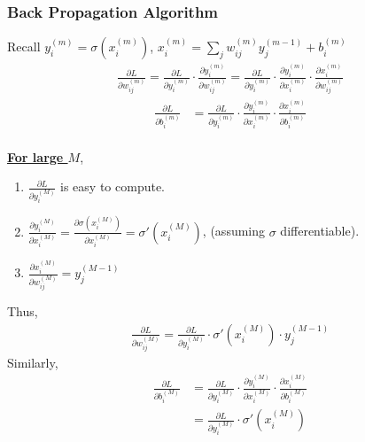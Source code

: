\documentclass[11pt,a4paper]{article}
\begin{document}
\subsubsection{Back Propagation Algorithm}
Recall $y_i^{(m)}=\sigma(x_i^{(m)})$, $x_i^{(m)}=\sum_jw_{ij}^{(m)}y_j^{(m-1)}+b_i^{(m)}$
\begin{equation}
    \begin{aligned}
        \frac{\partial L}{\partial w_{ij}^{(m)}}=\frac{\partial L}{\partial y_i^{(m)}}\cdot \frac{\partial y_i^{(m)}}{\partial w_{ij}^{(m)}}=\frac{\partial L}{\partial y_i^{(m)}}\cdot \frac{\partial y_i^{(m)}}{\partial x_{i}^{(m)}}\cdot \frac{\partial x_{i}^{(m)}}{\partial w_{ij}^{(m)}}
    \end{aligned}
    \nonumber
\end{equation}
\begin{equation}
    \begin{aligned}
        \frac{\partial L}{\partial b_{i}^{(m)}}&=\frac{\partial L}{\partial y_i^{(m)}}\cdot \frac{\partial y_i^{(m)}}{\partial x_{i}^{(m)}}\cdot \frac{\partial x_{i}^{(m)}}{\partial b_{i}^{(m)}}\\
    \end{aligned}
    \nonumber
\end{equation}

\textbf{\underline{For large $M$}},
\begin{enumerate}[$\bullet$]
    \item $\frac{\partial L}{\partial y_i^{(M)}}$ is easy to compute.
    \item $\frac{\partial y_i^{(M)}}{\partial x_{i}^{(M)}}=\frac{\partial \sigma(x_{i}^{(M)})}{\partial x_{i}^{(M)}}=\sigma'(x_{i}^{(M)})$, (assuming $\sigma$ differentiable).
    \item $\frac{\partial x_{i}^{(M)}}{\partial w_{ij}^{(M)}}=y_j^{(M-1)}$
\end{enumerate}
Thus,
\begin{equation}
    \begin{aligned}
        \frac{\partial L}{\partial w_{ij}^{(M)}}=\frac{\partial L}{\partial y_i^{(M)}}\cdot \sigma'(x_{i}^{(M)}) \cdot y_j^{(M-1)}
    \end{aligned}
    \nonumber
\end{equation}
Similarly,
\begin{equation}
    \begin{aligned}
        \frac{\partial L}{\partial b_{i}^{(M)}}&=\frac{\partial L}{\partial y_i^{(M)}}\cdot \frac{\partial y_i^{(M)}}{\partial x_{i}^{(M)}}\cdot \frac{\partial x_{i}^{(M)}}{\partial b_{i}^{(M)}}\\
        &=\frac{\partial L}{\partial y_i^{(M)}}\cdot \sigma'(x_{i}^{(M)})
    \end{aligned}
    \nonumber
\end{equation}
\end{document}
